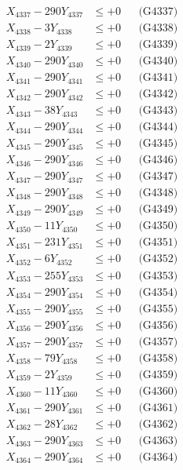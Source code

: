 \documentclass[a4paper,10pt]{article}
\begin{document}
{\begin{align}
X_{4337} - 290Y_{4337} &\leq +0 && \text{(G4337)} \\
X_{4338} - 3Y_{4338} &\leq +0 && \text{(G4338)} \\
X_{4339} - 2Y_{4339} &\leq +0 && \text{(G4339)} \\
X_{4340} - 290Y_{4340} &\leq +0 && \text{(G4340)} \\
\allowbreak
X_{4341} - 290Y_{4341} &\leq +0 && \text{(G4341)} \\
X_{4342} - 290Y_{4342} &\leq +0 && \text{(G4342)} \\
X_{4343} - 38Y_{4343} &\leq +0 && \text{(G4343)} \\
X_{4344} - 290Y_{4344} &\leq +0 && \text{(G4344)} \\
X_{4345} - 290Y_{4345} &\leq +0 && \text{(G4345)} \\
X_{4346} - 290Y_{4346} &\leq +0 && \text{(G4346)} \\
X_{4347} - 290Y_{4347} &\leq +0 && \text{(G4347)} \\
X_{4348} - 290Y_{4348} &\leq +0 && \text{(G4348)} \\
X_{4349} - 290Y_{4349} &\leq +0 && \text{(G4349)} \\
X_{4350} - 11Y_{4350} &\leq +0 && \text{(G4350)} \\
\allowbreak
X_{4351} - 231Y_{4351} &\leq +0 && \text{(G4351)} \\
X_{4352} - 6Y_{4352} &\leq +0 && \text{(G4352)} \\
X_{4353} - 255Y_{4353} &\leq +0 && \text{(G4353)} \\
X_{4354} - 290Y_{4354} &\leq +0 && \text{(G4354)} \\
X_{4355} - 290Y_{4355} &\leq +0 && \text{(G4355)} \\
X_{4356} - 290Y_{4356} &\leq +0 && \text{(G4356)} \\
X_{4357} - 290Y_{4357} &\leq +0 && \text{(G4357)} \\
X_{4358} - 79Y_{4358} &\leq +0 && \text{(G4358)} \\
X_{4359} - 2Y_{4359} &\leq +0 && \text{(G4359)} \\
X_{4360} - 11Y_{4360} &\leq +0 && \text{(G4360)} \\
\allowbreak
X_{4361} - 290Y_{4361} &\leq +0 && \text{(G4361)} \\
X_{4362} - 28Y_{4362} &\leq +0 && \text{(G4362)} \\
X_{4363} - 290Y_{4363} &\leq +0 && \text{(G4363)} \\
X_{4364} - 290Y_{4364} &\leq +0 && \text{(G4364)} \\

\end{align}}
\end{document}
